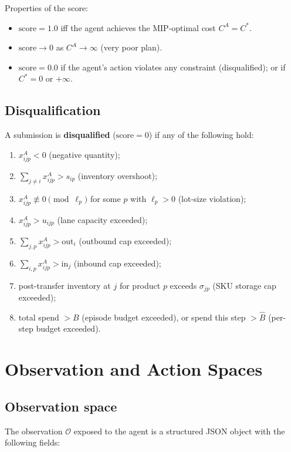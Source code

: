 \documentclass[11pt, a4paper]{article}
\begin{document}
Properties of the score:
\begin{itemize}[noitemsep]
  \item $\text{score} = 1.0$ iff the agent achieves the MIP-optimal cost
        $C^A = C^*$.
  \item $\text{score} \to 0$ as $C^A \to \infty$ (very poor plan).
  \item $\text{score} = 0.0$ if the agent's action violates any
        constraint (disqualified); or if $C^* = 0$ or $+\infty$.
\end{itemize}

\subsection{Disqualification}

A submission is \textbf{disqualified} ($\text{score} = 0$) if any of
the following hold:
\begin{enumerate}[noitemsep]
  \item $x_{ijp}^A < 0$ (negative quantity);
  \item $\sum_{j \neq i} x_{ijp}^A > s_{ip}$ (inventory overshoot);
  \item $x_{ijp}^A \not\equiv 0 \pmod{\ell_p}$ for some $p$ with
        $\ell_p > 0$ (lot-size violation);
  \item $x_{ijp}^A > u_{ijp}$ (lane capacity exceeded);
  \item $\sum_{j,p} x_{ijp}^A > \text{out}_i$ (outbound cap exceeded);
  \item $\sum_{i,p} x_{ijp}^A > \text{in}_j$ (inbound cap exceeded);
  \item post-transfer inventory at $j$ for product $p$ exceeds
        $\sigma_{jp}$ (SKU storage cap exceeded);
  \item total spend $> B$ (episode budget exceeded), or spend this step
        $> \hat{B}$ (per-step budget exceeded).
\end{enumerate}

\section{Observation and Action Spaces}

\subsection{Observation space}

The observation $\mathcal{O}$ exposed to the agent is a structured
JSON object with the following fields:
\end{document}
